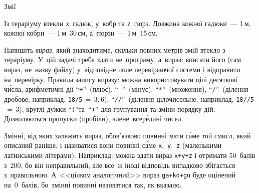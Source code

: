{

\PrintEjudgeConstraintsfalse

\begin{problemAllDefault}{Змії}

Із тераріуму втекли \texttt{x}~гадюк, \texttt{y}~кобр та \texttt{z}~гюрз. 
Довжина кожної гадюки~--- 1$\,$м,
кожної кобри~--- 1$\,$м~30$\,$см,
а~гюрзи~--- 1$\,$м~15$\,$см.

Напишіть \emph{вираз}, який знаходитиме, скільки повних метрів змій втекло з тераріуму. 
У~цій задачі треба здати не~програму, а~вираз: 
вписати його (сам вираз, не~назву файлу) у~відповідне поле перевіряючої системи
і відправити на~перевірку. Правила запису виразу:
можна використовувати цілі десяткові ч\'{и}сла, арифметичні дії ``\verb"+"''~(плюс), 
``\verb"-"''~(мінус), ``\verb"*"''~(множення), ``\verb"/"''~(ділення дробове, наприклад, \verb"18/5"$\,{=}\,3{,}6$), ``\verb"//"''~(ділення цілочисельне, наприклад, \verb"18//5"$\,{=}\,3$), круглі дужки ``\verb"("''\nolinebreak[2] та~``\verb")"'' 
для групування та зміни порядку дій.
Дозволяються пропуски (пробіли), але\nolinebreak[3] не~всер\'{е}дині чисел.

Змінні, від яких залежить вираз, обов'язково повинні мати с\'{а}ме той смисл, який описаний раніше, і називатися вони повинні с\'{а}ме \texttt{x},~\texttt{y},~\texttt{z} (маленькими латинськими літерами).
%
Наприклад: можна здати вираз 
\verb"x+y+z" 
і отримати 50~балів з~200, бо він неправильний,
але все~ж іноді відповідь випадково збігається з~правильною. 
А~<<цілком аналогічний>> вираз 
\verb"ga+ko+gu"
буде оцінений на~0~балів, 
бо~змінні повинні називатися так, як вказано.

\end{problemAllDefault}

}